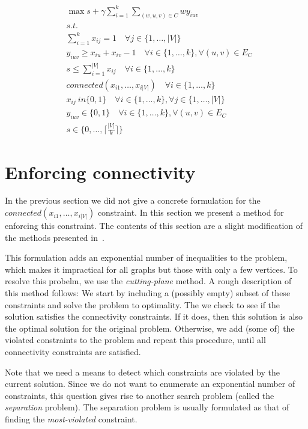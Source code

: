 \documentclass[]{article}
\begin{document}
\begin{align}
&\max s + \gamma \sum_{i=1}^{k} \sum_{(w, u, v) \in C} w y_{iuv} \\
&\textit{s.t.} \\
& \sum_{i=1}^k x_{ij} = 1 \quad \forall j \in \{1, \ldots, |V|\} \\
& y_{iuv} \geq x_{iu} + x_{iv} -1 \quad \forall i \in \{1, \ldots, k\}, \forall (u, v) \in E_{C} \\
&s \leq \sum_{i=1}^{|V|} x_{ij} \quad \forall i \in \{1, \ldots, k\} \\
& connected(x_{i1}, \ldots, x_{i|V|}) \quad \forall i \in \{1, \ldots, k\} \\
& x_{ij} \ in \{0, 1\} \quad \forall i \in \{1, \ldots, k\}, \forall j \in \{1, \ldots, |V|\} \\
& y_{iuv} \in \{0, 1\} \quad \forall i \in \{1, \ldots, k\}, \forall (u, v) \in E_{C} \\
& s \in \{0, \ldots, \lceil \frac{|V|}{k} \rceil \}
\end{align}

\section{Enforcing connectivity}
\label{sec:connectivity}

In the previous section we did not give a concrete formulation for the
$connected(x_{i1}, \ldots, x_{i|V|})$ constraint. In this section we
present a method for enforcing this constraint. The contents of this
section are a slight modification of the methods presented in~\citet{carvajal2013}.

This formulation adds an exponential number of inequalities to the
problem, which makes it impractical for all graphs but those with only a
few vertices. To resolve this probelm, we use the \emph{cutting-plane}
method. A rough description of this method follows: We start by
including a (possibly empty) subset of these constraints and solve the
problem to optimality. The we check to see if the solution satisfies the
connectivity constraints. If it does, then this solution is also the
optimal solution for the original problem. Otherwise, we add (some of)
the violated constraints to the problem and repeat this procedure, until
all connectivity constraints are satisfied.

Note that we need a means to detect which constraints are violated by
the current solution. Since we do not want to enumerate an exponential
number of constraints, this question gives rise to another search
problem (called the \emph{separation} problem). The separation problem
is usually formulated as that of finding the \emph{most-violated}
constraint.
\end{document}
